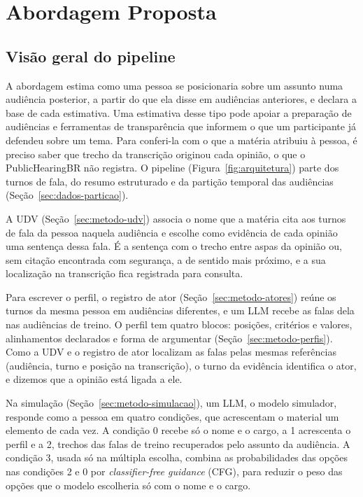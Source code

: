 \section{Abordagem Proposta}
\label{sec:metodo}

\subsection{Visão geral do pipeline}
\label{sec:metodo-visao}



A abordagem estima como uma pessoa se posicionaria sobre um assunto numa audiência posterior, a
partir do que ela disse em audiências anteriores, e declara a base de cada estimativa. Uma estimativa
desse tipo pode apoiar a preparação de audiências e ferramentas de transparência que informem o que
um participante já defendeu sobre um tema. Para conferi-la com o que a matéria atribuiu à pessoa, é
preciso saber que trecho da transcrição originou cada opinião, o que o PublicHearingBR não registra.
O pipeline (Figura~\ref{fig:arquitetura}) parte dos turnos de fala, do resumo estruturado e da
partição temporal das audiências (Seção~\ref{sec:dados-particao}).

A UDV (Seção~\ref{sec:metodo-udv}) associa o nome que a matéria cita aos turnos de fala da pessoa
naquela audiência e escolhe como evidência de cada opinião uma sentença dessa fala. É a sentença com
o trecho entre aspas da opinião ou, sem citação encontrada com segurança, a de sentido mais próximo, e
a sua localização na transcrição fica registrada para consulta.

Para escrever o perfil, o registro de ator (Seção~\ref{sec:metodo-atores}) reúne os turnos da mesma
pessoa em audiências diferentes, e um LLM recebe as falas dela nas audiências de treino. O perfil tem
quatro blocos: posições, critérios e valores, alinhamentos declarados e forma de argumentar
(Seção~\ref{sec:metodo-perfis}). Como a UDV e o registro de ator localizam as falas pelas mesmas
referências (audiência, turno e posição na transcrição), o turno da evidência identifica o ator, e
dizemos que a opinião está ligada a ele.

Na simulação (Seção~\ref{sec:metodo-simulacao}), um LLM, o modelo simulador, responde como a pessoa
em quatro condições, que acrescentam o material um elemento de cada vez. A condição 0 recebe só o
nome e o cargo, a 1 acrescenta o perfil e a 2, trechos das falas de treino recuperados pelo assunto
da audiência. A condição 3, usada só na múltipla escolha, combina as probabilidades das opções nas
condições 2 e 0 por \textit{classifier-free guidance} (CFG), para reduzir o peso das opções que o
modelo escolheria só com o nome e o cargo.

